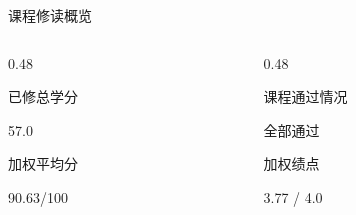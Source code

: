 \documentclass{beamer}
\begin{document}
\begin{frame}{课程修读概览}
\vspace{-1.2em} 

\begin{columns}[T, onlytextwidth]
    \begin{column}{0.48\textwidth}
        \begin{block}{已修总学分}
            \begin{minipage}[c][0.5cm][c]{\textwidth}
                \centering
                {\footnotesize 57.0}
            \end{minipage}
        \end{block}
        
        \vspace{0.05em} %
        
        \begin{block}{加权平均分}
            \begin{minipage}[c][0.5cm][c]{\textwidth}
                \centering
                {\footnotesize 90.63/100}
            \end{minipage}
        \end{block}
    \end{column}
    
    \begin{column}{0.48\textwidth}
        \begin{block}{课程通过情况}
            \begin{minipage}[c][0.5cm][c]{\textwidth}
                \centering
                {\footnotesize 全部通过}
            \end{minipage}
        \end{block}
        
        \vspace{0.05em}
        
        \begin{block}{加权绩点}
            \begin{minipage}[c][0.5cm][c]{\textwidth}
                \centering
                {\footnotesize 3.77 / 4.0}
            \end{minipage}
        \end{block}
    \end{column}
\end{columns}

\vspace{0.1em} 


\end{frame}
\end{document}
